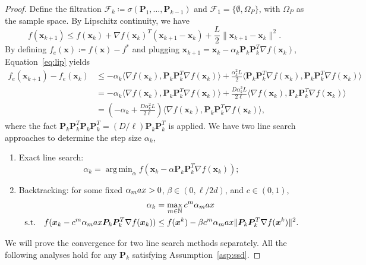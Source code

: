 \documentclass[10pt,a4paper]{amsart}
\DeclareMathOperator*{\argmin}{arg\,min}
\newcommand{\Lip}{L}
\newcommand{\alphaMax}{\alpha_\textup{max}}
\begin{document}
\begin{proof}
Define the filtration $\mathcal{F}_k\coloneqq \sigma(\bm P_1,\dots,\bm P_{k-1})$ and $\mathcal{F}_1=\{\emptyset, \Omega_P\}$, with $\Omega_P$ as the sample space. By Lipschitz continuity, we have
\begin{equation}
\label{eq:lip}
    f(\bm x_{k+1})\leq f(\bm x_k) + \nabla f(\bm x_k)^T(\bm x_{k+1} - \bm x_k) + \frac{\Lip}{2}\lVert\bm x_{k+1} - \bm x_k\rVert^2.
\end{equation}
By defining $f_e(\bm x) \coloneqq f(\bm x) - f^*$ and plugging $\bm x_{k+1} = \bm x_k - \alpha_k\bm P_k\bm P_k^T\nabla f(\bm x_k)$, Equation~\eqref{eq:lip} yields
\begin{equation}
\label{eqn:quad-form}
\begin{aligned}
f_e(\bm x_{k+1}) - f_e(\bm x_k) 
&\leq -\alpha_k\langle \nabla f(\bm x_k), \bm P_k\bm P_k^T\nabla f(\bm x_k)\rangle + \frac{\alpha_k^2\Lip}{2}\langle \bm P_k\bm P_k^T\nabla f(\bm x_k), \bm P_k\bm P_k^T\nabla f(\bm x_k)\rangle \\
&= -\alpha_k\langle \nabla f(\bm x_k), \bm P_k\bm P_k^T\nabla f(\bm x_k)\rangle + \frac{D\alpha_k^2\Lip}{2\ell}\langle \nabla f(\bm x_k), \bm P_k\bm P_k^T\nabla f(\bm x_k)\rangle \\
&= \left(-\alpha_k+\frac{D\alpha_k^2\Lip}{2\ell}\right)\langle \nabla f(\bm x_k), \bm P_k\bm P_k^T\nabla f(\bm x_k)\rangle,
\end{aligned}
\end{equation}
where the fact $\bm P_k\bm P_k^T\bm P_k\bm P_k^T = (D/\ell)\bm P_k\bm P_k^T$ is applied. We have two line search approaches to determine the step size $\alpha_k$,
\begin{enumerate}
    \item Exact line search: 
    \begin{equation}
    \label{eq:exact-line-sear}
    \alpha_k = \argmin_\alpha f(\bm x_k - \alpha\bm P_k\bm P_k^T\nabla f(\bm x_k));
    \end{equation}
    \item Backtracking: for some fixed $\alphaMax>0$, $\beta\in(0,\ell/2d)$, and $c\in(0,1)$, 
    \begin{equation}
    \label{eq:backtracking}
    \begin{aligned}
    \alpha_k &= \max_{m\in\mathbb{N}} c^m\alphaMax\\
    \text{s.t.}\quad
    f(\bm x_k - c^m\alphaMax\bm P_k\bm P_k^T\nabla f(\bm x_k))&\leq f(\bm x^k) - \beta c^m \alphaMax\lVert \bm P_k\bm P_k^T\nabla f(\bm x^k)\rVert^2.
    \end{aligned}
    \end{equation}
\end{enumerate}
We will prove the convergence for two line search methods separately. All the following analyses hold for any $\bm P_k$ satisfying Assumption~\ref{asp:ssd}.


\end{proof}
\end{document}
